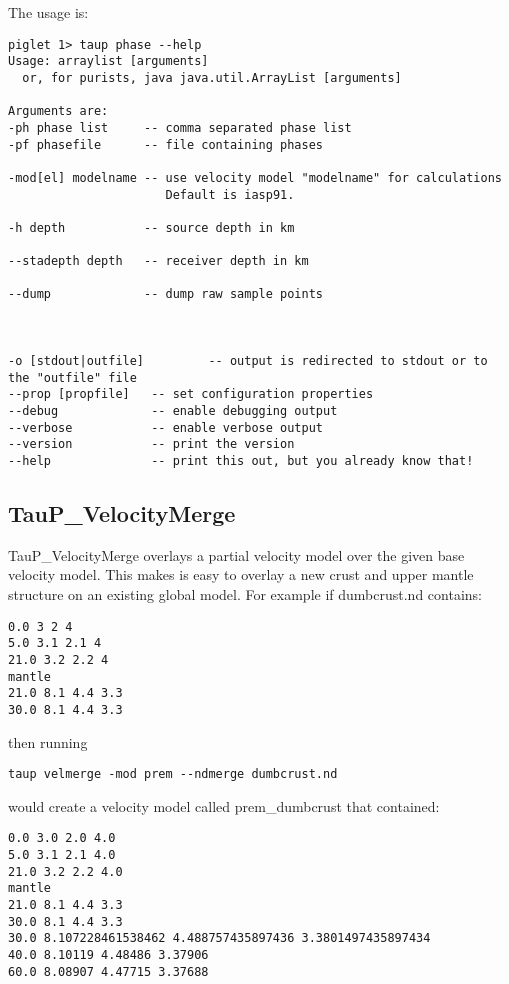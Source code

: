 The usage is:
\begin{verbatim}
piglet 1> taup phase --help
Usage: arraylist [arguments]
  or, for purists, java java.util.ArrayList [arguments]

Arguments are:
-ph phase list     -- comma separated phase list
-pf phasefile      -- file containing phases

-mod[el] modelname -- use velocity model "modelname" for calculations
                      Default is iasp91.

-h depth           -- source depth in km

--stadepth depth   -- receiver depth in km

--dump             -- dump raw sample points



-o [stdout|outfile]         -- output is redirected to stdout or to the "outfile" file
--prop [propfile]   -- set configuration properties
--debug             -- enable debugging output
--verbose           -- enable verbose output
--version           -- print the version
--help              -- print this out, but you already know that!
\end{verbatim}

\subsection{TauP\_VelocityMerge}

TauP\_VelocityMerge overlays a partial velocity model over the given base velocity model. This makes is easy to overlay a new crust and
upper mantle structure on an existing global model. For example
if dumbcrust.nd contains:
\begin{verbatim}
0.0 3 2 4
5.0 3.1 2.1 4
21.0 3.2 2.2 4
mantle
21.0 8.1 4.4 3.3
30.0 8.1 4.4 3.3
\end{verbatim}

then running
\begin{verbatim}
taup velmerge -mod prem --ndmerge dumbcrust.nd
\end{verbatim}

would create a velocity model called prem\_dumbcrust that contained:

\begin{verbatim}
0.0 3.0 2.0 4.0
5.0 3.1 2.1 4.0
21.0 3.2 2.2 4.0
mantle
21.0 8.1 4.4 3.3
30.0 8.1 4.4 3.3
30.0 8.107228461538462 4.488757435897436 3.3801497435897434
40.0 8.10119 4.48486 3.37906
60.0 8.08907 4.47715 3.37688
\end{verbatim}

